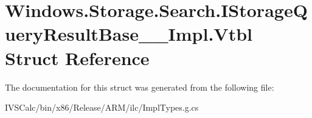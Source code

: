\hypertarget{struct_windows_1_1_storage_1_1_search_1_1_i_storage_query_result_base_____impl_1_1_vtbl}{}\section{Windows.\+Storage.\+Search.\+I\+Storage\+Query\+Result\+Base\+\_\+\+\_\+\+Impl.\+Vtbl Struct Reference}
\label{struct_windows_1_1_storage_1_1_search_1_1_i_storage_query_result_base_____impl_1_1_vtbl}


The documentation for this struct was generated from the following file\+:\begin{DoxyCompactItemize}
\item 
I\+V\+S\+Calc/bin/x86/\+Release/\+A\+R\+M/ilc/Impl\+Types.\+g.\+cs\end{DoxyCompactItemize}
